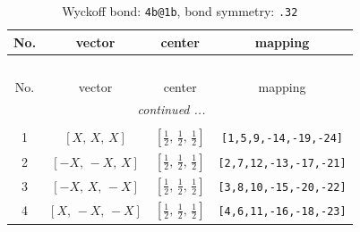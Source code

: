 \documentclass[fleqn,8pt]{jsarticle}
\begin{document}
\renewcommand{\arraystretch}{1.2}
\begin{longtable}{cccc}
\caption{Wyckoff bond: {\tt 4b@1b}, bond symmetry: {\tt .32}}
 \\
 \hline \hline
No. & vector & center & mapping \\ \hline \endfirsthead

\multicolumn{3}{l}{\tablename\ \thetable{}} \\
 \hline \hline
No. & vector & center & mapping \\ \hline \endhead

 \hline \hline
\multicolumn{3}{r}{\footnotesize\it continued ...} \\ \endfoot

 \hline \hline
\multicolumn{3}{r}{} \\ \endlastfoot

1 & $\left[ X,\, X,\, X \right]$ & $\left[ \frac{1}{2},\, \frac{1}{2},\, \frac{1}{2} \right]$ & {\tt [1,5,9,-14,-19,-24]} \\ \hline
2 & $\left[ - X,\, - X,\, X \right]$ & $\left[ \frac{1}{2},\, \frac{1}{2},\, \frac{1}{2} \right]$ & {\tt [2,7,12,-13,-17,-21]} \\ \hline
3 & $\left[ - X,\, X,\, - X \right]$ & $\left[ \frac{1}{2},\, \frac{1}{2},\, \frac{1}{2} \right]$ & {\tt [3,8,10,-15,-20,-22]} \\ \hline
4 & $\left[ X,\, - X,\, - X \right]$ & $\left[ \frac{1}{2},\, \frac{1}{2},\, \frac{1}{2} \right]$ & {\tt [4,6,11,-16,-18,-23]} \\
\end{longtable}
\renewcommand{\arraystretch}{1.2}
\end{document}
